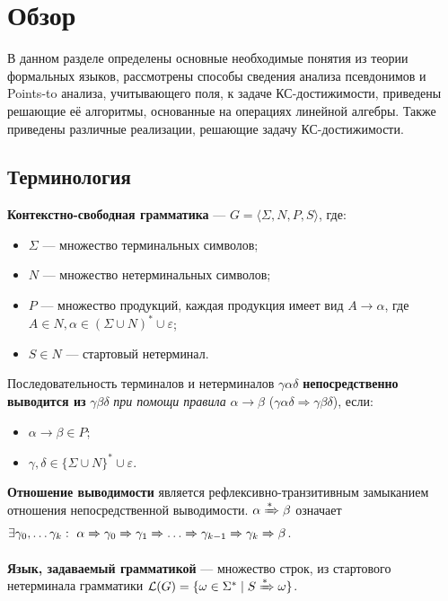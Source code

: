 \section{Обзор}

В данном разделе определены основные необходимые понятия из
теории формальных языков, рассмотрены способы сведения анализа псевдонимов и Points-to анализа, учитывающего поля, к задаче КС-достижимости, приведены решающие её алгоритмы, основанные на операциях линейной алгебры. Также приведены различные реализации, решающие задачу КС-достижимости.

\subsection{Терминология}
\textbf{Контекстно-свободная грамматика} --- $G = \langle \Sigma, N, P, S\rangle$, где:
\begin{itemize}
    \item $\Sigma$ --- множество терминальных символов;
    \item $N$ --- множество нетерминальных символов;
    \item $P$ --- множество продукций, каждая продукция имеет вид $A \to \alpha$, где $A \in N, \alpha \in (\Sigma \cup N)^* \cup {\varepsilon}$;
    \item $S \in N$ --- стартовый нетерминал.
\end{itemize}

Последовательность терминалов и нетерминалов $\gamma \alpha \delta$ \textbf{непосредственно выводится из} $\gamma \beta \delta$ \textit{при помощи правила} $\alpha \rightarrow \beta$ ($\gamma \alpha \delta \Rightarrow \gamma \beta \delta$), если:
\begin{itemize}
    \item $\alpha \rightarrow \beta \in P$;
    \item $\gamma, \delta \in \{\Sigma \cup N\}^* \cup {\varepsilon}$.
  \end{itemize}

\textbf{Отношение выводимости} является рефлексивно-транзитивным замыканием отношения непосредственной выводимости. $\alpha \xRightarrow[]{*} \beta$ означает $\exists \gamma_0, \dots \gamma_k: \ \alpha \derives[] \gamma_0 \derives[] \gamma_1 \derives[] \dots \derives[] \gamma_{k-1} \derives[] \gamma_{k} \derives[] \beta$.

\textbf{Язык, задаваемый грамматикой} --- множество строк, из стартового нетерминала грамматики $\mathcal{L} (G) = \{ \omega \in \Sigma^* \mid S \xRightarrow[]{*} \omega \}$.

